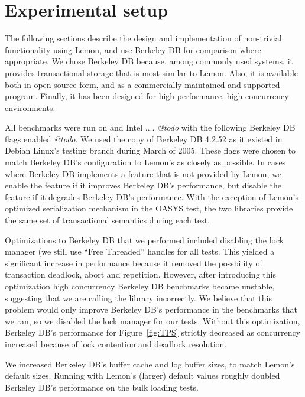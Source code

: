\documentclass[letterpaper,twocolumn,english]{article}
\newcommand{\yad}{Lemon\xspace}
\begin{document}


\section{Experimental setup}

The following sections describe the design and implementation of
non-trivial functionality using \yad, and use Berkeley DB for
comparison where appropriate.  We chose Berkeley DB because, among
commonly used systems, it provides transactional storage that is most
similar to \yad.  Also, it is available both in open-source form, and as a
commercially maintained and supported program.  Finally, it has been 
designed for high-performance, high-concurrency environments.

All benchmarks were run on and Intel .... {\em @todo} with the
following Berkeley DB flags enabled {\em @todo}.  We used the copy
of Berkeley DB 4.2.52 as it existed in Debian Linux's testing
branch during March of 2005.  These flags were chosen to match 
Berkeley DB's configuration to \yad's as closely as possible.  In cases where
Berkeley DB implements a feature that is not provided by \yad, we
enable the feature if it improves Berkeley DB's performance, but
disable the feature if it degrades Berkeley DB's performance.  With 
the exception of \yad's optimized serialization mechanism in the 
OASYS test, the two libraries provide the same set of transactional 
semantics during each test.  

Optimizations to Berkeley DB that we performed included disabling the
lock manager (we still use ``Free Threaded'' handles for all tests.
This yielded a significant increase in performance because it removed
the possbility of transaction deadlock, abort and repetition.
However, after introducing this optimization high concurrency Berkeley
DB benchmarks became unstable, suggesting that we are calling the
library incorrectly.  We believe that this problem would only improve
Berkeley DB's performance in the benchmarks that we ran, so we
disabled the lock manager for our tests.  Without this optimization,
Berkeley DB's performance for Figure~\ref{fig:TPS} strictly decreased as
concurrency increased because of lock contention and deadlock resolution.

We increased Berkeley DB's buffer cache and log buffer sizes, to match
\yad's default sizes.  Running with \yad's (larger) default values
roughly doubled Berkeley DB's performance on the bulk loading tests.
\end{document}

